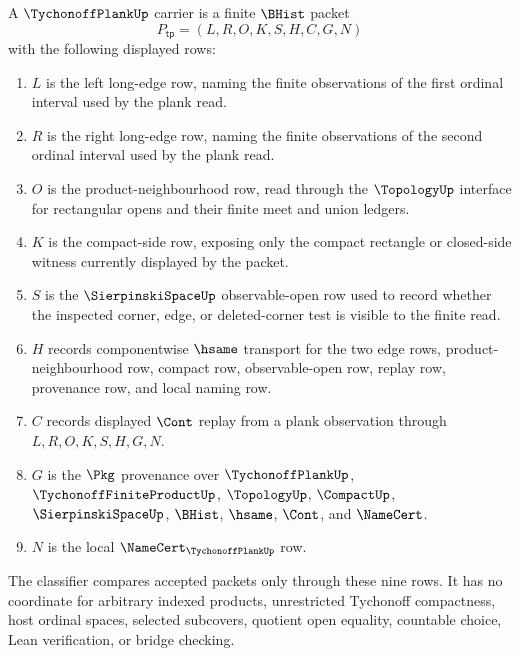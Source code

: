 \begin{definition}
\label{def:tychonoff-plank-carrier}
A $\TychonoffPlankUp$ carrier is a finite $\BHist$ packet
$$
P_{\mathsf{tp}}=(L,R,O,K,S,H,C,G,N)
$$
with the following displayed rows:
\begin{enumerate}
\item $L$ is the left long-edge row, naming the finite observations of the first ordinal interval used by the plank read.
\item $R$ is the right long-edge row, naming the finite observations of the second ordinal interval used by the plank read.
\item $O$ is the product-neighbourhood row, read through the $\TopologyUp$ interface for rectangular opens and their finite meet and union ledgers.
\item $K$ is the compact-side row, exposing only the compact rectangle or closed-side witness currently displayed by the packet.
\item $S$ is the $\SierpinskiSpaceUp$ observable-open row used to record whether the inspected corner, edge, or deleted-corner test is visible to the finite read.
\item $H$ records componentwise $\hsame$ transport for the two edge rows, product-neighbourhood row, compact row, observable-open row, replay row, provenance row, and local naming row.
\item $C$ records displayed $\Cont$ replay from a plank observation through $L,R,O,K,S,H,G,N$.
\item $G$ is the $\Pkg$ provenance over $\TychonoffPlankUp$, $\TychonoffFiniteProductUp$, $\TopologyUp$, $\CompactUp$, $\SierpinskiSpaceUp$, $\BHist$, $\hsame$, $\Cont$, and $\NameCert$.
\item $N$ is the local $\NameCert_{\TychonoffPlankUp}$ row.
\end{enumerate}
The classifier compares accepted packets only through these nine rows. It has no coordinate for arbitrary indexed products, unrestricted Tychonoff compactness, host ordinal spaces, selected subcovers, quotient open equality, countable choice, Lean verification, or bridge checking.
\end{definition}

